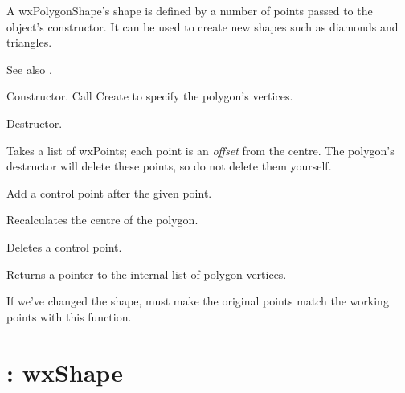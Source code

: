 A wxPolygonShape's shape is defined by a number of points passed to the object's
constructor. It can be used to create new shapes such as diamonds and triangles.

See also .



Constructor. Call Create to specify the polygon's vertices.



Destructor.



Takes a list of wxPoints; each point is an {\it offset} from the centre.
The polygon's destructor will delete these points, so do not delete them yourself.



Add a control point after the given point.



Recalculates the centre of the polygon.



Deletes a control point.



Returns a pointer to the internal list of polygon vertices.



If we've changed the shape, must make the original
points match the working points with this function.

\section{: wxShape}\label{wxrectangleshape}

